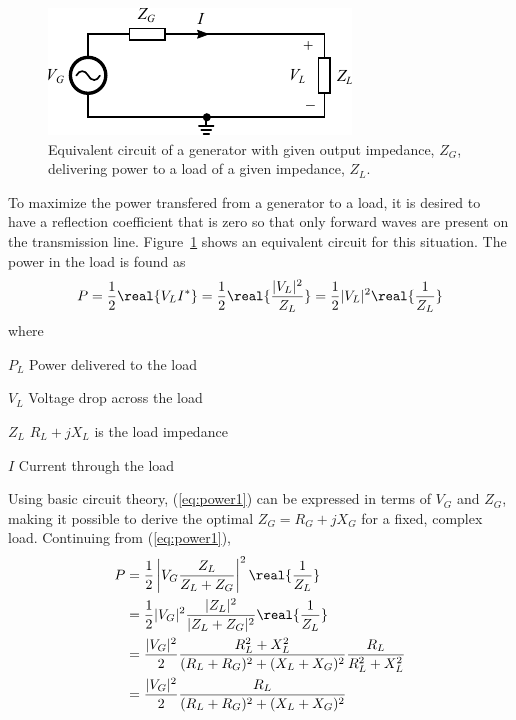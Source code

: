 \begin{figure}[htbp]
    \centering
    \includegraphics{img/analysis/generator_load}
    \caption{Equivalent circuit of a generator with given output impedance, $Z_G$, delivering power to a load of a given impedance, $Z_L$.}
    \label{fig:generator_load}
\end{figure}

To maximize the power transfered from a generator to a load, it is desired to have a reflection coefficient that is zero so that only forward waves are present on the transmission line. Figure~\ref{fig:generator_load} shows an equivalent circuit for this situation. The power in the load is found as \cite{pozar2011microwave}
\begin{equation}
    \label{eq:power1}
    P = \frac{1}{2} \real{V_LI^*} = \frac{1}{2} \real{\frac{|V_L|^2}{Z_L}}
    = \frac{1}{2} |V_L|^2 \real{\frac{1}{Z_L}}
\end{equation}
where
\begin{where}
\item[$P_L$] Power delivered to the load
\item[$V_L$] Voltage drop across the load
\item[$Z_L$] $R_L+jX_L$ is the load impedance
\item[$I$] Current through the load
\end{where}
Using basic circuit theory, (\ref{eq:power1}) can be expressed in terms of $V_G$ and $Z_G$, making it possible to derive the optimal $Z_G = R_G+jX_G$ for a fixed, complex load. Continuing from (\ref{eq:power1}),
\begin{equation}
    \begin{aligned}
        P &= \frac{1}{2} \left| V_G \frac{Z_L}{Z_L+Z_G} \right|^2 \real{\frac{1}{Z_L}} \\
        &= \frac{1}{2} |V_G|^2 \frac{|Z_L|^2}{|Z_L+Z_G|^2} \real{\frac{1}{Z_L}}\\
        &= \frac{|V_G|^2}{2} \frac{R_L^2+X_L^2}{(R_L+R_G)^2+(X_L+X_G)^2} \frac{R_L}{R_L^2 + X_L^2}\\
        &= \frac{|V_G|^2}{2} \frac{R_L}{(R_L+R_G)^2 + (X_L+X_G)^2}
    \end{aligned}
\end{equation}
